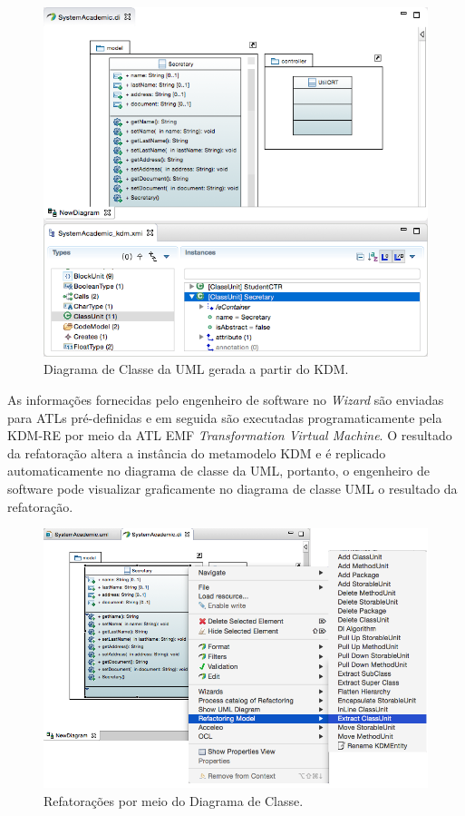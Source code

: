 \begin{figure}[!h]
	\centering
	\caption{Diagrama de Classe da UML gerada a partir do KDM.}
	\label{fig:kdmToUML_diagrama_de_classe}
	\includegraphics[scale=0.5]{images/refatoracao_UML_papyrus}
	\fautor
\end{figure}

As informações fornecidas pelo engenheiro de software no \textit{Wizard} são enviadas para ATLs pré-definidas e em seguida são executadas programaticamente pela KDM-RE por meio da ATL EMF \textit{Transformation Virtual Machine}. O resultado da refatoração altera a instância do metamodelo KDM e é replicado automaticamente no diagrama de classe da UML, portanto, o engenheiro de software pode visualizar graficamente no diagrama de classe UML o resultado da refatoração.

\begin{figure}[!h]
	\centering
	\caption{Refatorações por meio do Diagrama de Classe.}
	\label{fig:refatoracao_papyrus_KDM_iteragir}
	\includegraphics[scale=0.5]{images/kdm_uml_papyrus_refactoring_extract_class_new}
	\fautor
\end{figure}

